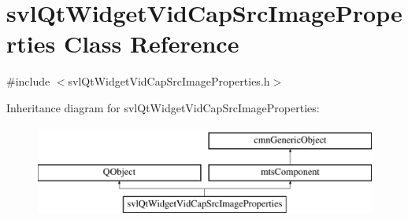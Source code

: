 \hypertarget{classsvl_qt_widget_vid_cap_src_image_properties}{}\section{svl\+Qt\+Widget\+Vid\+Cap\+Src\+Image\+Properties Class Reference}
\label{classsvl_qt_widget_vid_cap_src_image_properties}


{\ttfamily \#include $<$svl\+Qt\+Widget\+Vid\+Cap\+Src\+Image\+Properties.\+h$>$}

Inheritance diagram for svl\+Qt\+Widget\+Vid\+Cap\+Src\+Image\+Properties\+:\begin{figure}[H]
\begin{center}
\leavevmode
\includegraphics[height=3.000000cm]{d2/d5d/classsvl_qt_widget_vid_cap_src_image_properties}
\end{center}
\end{figure}
